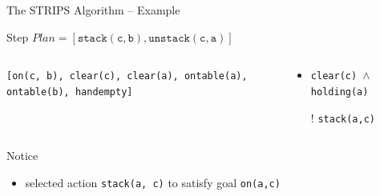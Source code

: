 \documentclass[presentation]{beamer}\mode<presentation>{\usetheme{AMSBolognaFC}}
\begin{document}
\begin{frame}[c]{The STRIPS Algorithm -- Example}
\small

\begin{exampleblock}{Step \nextStripsExampleStep{} \hfill $Plan = [\mathtt{stack(c,b),unstack(c,a)}]$}
    \begin{columns}[t]
        \begin{column}{.30\linewidth}\centering
            \texttt{[on(c, b), clear(c), clear(a), ontable(a), ontable(b), handempty]}
        \end{column}
        \begin{column}{.50\linewidth}\centering
            \begin{itemize}
                \item \texttt{clear(c) $\wedge$ holding(a)}
                \item[!] \texttt{stack(a,c)}
            \end{itemize}
        \end{column}
        \begin{column}{.10\linewidth}\centering
            
        \end{column}
    \end{columns}
\end{exampleblock}

\vfill

\footnotesize
Notice
\begin{itemize}\tiny
    \item selected action \texttt{stack(a, c)} to satisfy goal \texttt{on(a,c)}
\end{itemize}

\end{frame}
\end{document}
